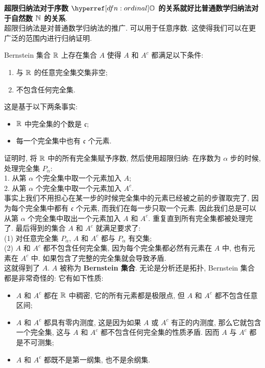         \begin{rmk}
            [Dedicatia]
            \textbf{超限归纳法对于序数 \(\ordinal\) 的关系就好比普通数学归纳法对于自然数 \(\operatorname{\mathbb{N}}\) 的关系}.\\
            超限归纳法是对普通数学归纳法的推广. 可以用于任意序数. 这使得我们可以在更广泛的范围内进行归纳证明.
        \end{rmk}

        \begin{ins}
            {Bernstein 集合}
            \(\operatorname{\mathbb{R}}\) 上存在集合 \(A\) 使得 \(A\) 和 \(A^c\) 都满足以下条件:
            \begin{enumerate}[label=(\roman*)]
                \item 与 \(\operatorname{\mathbb{R}}\) 的任意完全集交集非空;
                \item 不包含任何完全集.
            \end{enumerate}
            这是基于以下两条事实:
            \begin{itemize}
                \item \(\operatorname{\mathbb{R}}\) 中完全集的个数是 \(\mathfrak{c}\);
                \item 每一个完全集中也有 \(\mathfrak{c}\) 个元素.
            \end{itemize}
            证明时, 将 \(\operatorname{\mathbb{R}}\) 中的所有完全集赋予序数, 然后使用超限归纳: 在序数为 \(\alpha\) 步的时候, 处理完全集 \(P_\alpha\):\\
            1. 从第 \(\alpha\) 个完全集中取一个元素加入 \(A\);\\
            2. 从第 \(\alpha\) 个完全集中取一个元素加入 \(A^c\).\\
            事实上我们不用担心在某一步的时候完全集中的元素已经被之前的步骤取完了, 因为每个完全集中都有 \(\mathfrak{c}\) 个元素, 而我们在每一步只取一个元素. 因此我们总是可以从第 \(\alpha\) 个完全集中取出一个元素加入 \(A\) 和 \(A^c\). 重复直到所有完全集都被处理完了. 最后得到的集合 \(A\) 和 \(A^c\) 就满足要求了:\\
            (1) 对任意完全集 \(P_\alpha\), \(A\) 和 \(A^c\) 都与 \(P_\alpha\) 有交集;\\
            (2) \(A\) 和 \(A^c\) 都不包含任何完全集, 因为每个完全集都必然有元素在 \(A\) 中, 也有元素在 \(A^c\) 中. 如果包含了完整的完全集就会导致矛盾.\\
            这就得到了 \(A\). \(A\) 被称为 \textbf{Bernstein 集合}.
            \tcbline
            无论是分析还是拓扑, Bernstein 集合都是非常奇怪的: 它有如下性质:
            \begin{itemize}
                \item \(A\) 和 \(A^c\) 都在 \(\operatorname{\mathbb{R}}\) 中稠密, 它的所有元素都是极限点, 但 \(A\) 和 \(A^c\) 都不包含任意区间;
                \item \(A\) 和 \(A^c\) 都具有零内测度, 这是因为如果 \(A\) 或 \(A^c\) 有正的内测度, 那么它就包含一个完全集, 这与 \(A\) 和 \(A^c\) 都不包含任何完全集的性质矛盾. 因而 \(A\) 与 \(A^c\) 都是不可测集;
                \item \(A\) 和 \(A^c\) 都既不是第一纲集, 也不是余纲集.
            \end{itemize}
        \end{ins}

